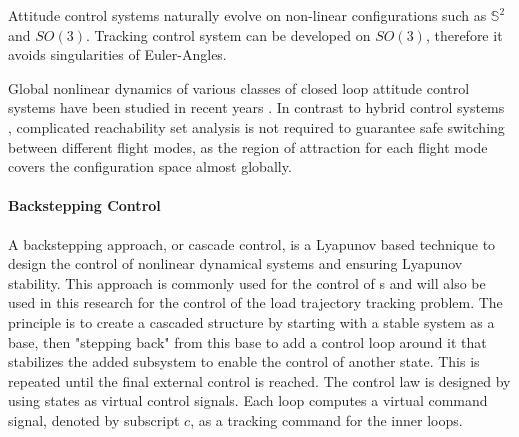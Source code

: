 Attitude control systems naturally evolve on non-linear configurations such as $ \mathbb{S}^2 $ and $ SO(3) $. 
Tracking control system can be developed on $ SO(3) $, therefore it avoids singularities of Euler-Angles.

Global nonlinear dynamics of various classes of closed loop attitude control systems have been studied in recent years \cite{Chaturvedi2011a}.
In contrast to hybrid control systems \cite{Gillula2010}, complicated reachability set analysis is not required to guarantee safe switching between different flight modes, as the region of attraction for each flight mode covers the configuration space almost globally.

\paragraph{Backstepping Control}\label{sec:con.back}
A backstepping approach, or cascade control, is a Lyapunov based technique to design the control of nonlinear dynamical systems and ensuring Lyapunov stability. This approach is commonly used for the control of s \cite{Mahony2012} and will also be used in this research for the control of the load trajectory tracking problem.
The principle is to create a cascaded structure by starting with a stable system as a base, then "stepping back" from this base to add a control loop around it that stabilizes the added subsystem to enable the control of another state. This is repeated until the final external control is reached.
The control law is designed by using states as virtual control signals. Each loop computes a virtual command signal, denoted by subscript $ c $, as a tracking command for the inner loops. 


